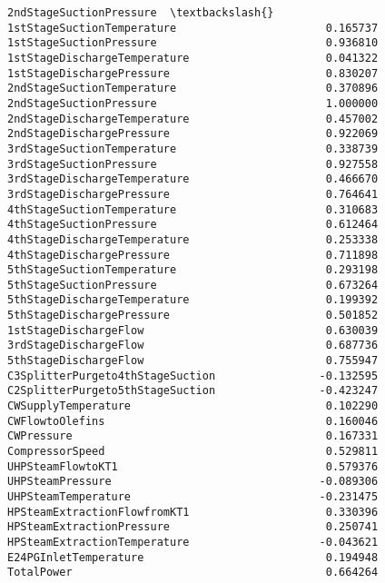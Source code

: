 \documentclass[11pt]{article}
\begin{document}
\begin{tcolorbox}[breakable, size=fbox, boxrule=.5pt, pad at break*=1mm, opacityfill=0]
\begin{Verbatim}[commandchars=\\\{\}]
                                  2ndStageSuctionPressure  \textbackslash{}
1stStageSuctionTemperature                       0.165737
1stStageSuctionPressure                          0.936810
1stStageDischargeTemperature                     0.041322
1stStageDischargePressure                        0.830207
2ndStageSuctionTemperature                       0.370896
2ndStageSuctionPressure                          1.000000
2ndStageDischargeTemperature                     0.457002
2ndStageDischargePressure                        0.922069
3rdStageSuctionTemperature                       0.338739
3rdStageSuctionPressure                          0.927558
3rdStageDischargeTemperature                     0.466670
3rdStageDischargePressure                        0.764641
4thStageSuctionTemperature                       0.310683
4thStageSuctionPressure                          0.612464
4thStageDischargeTemperature                     0.253338
4thStageDischargePressure                        0.711898
5thStageSuctionTemperature                       0.293198
5thStageSuctionPressure                          0.673264
5thStageDischargeTemperature                     0.199392
5thStageDischargePressure                        0.501852
1stStageDischargeFlow                            0.630039
3rdStageDischargeFlow                            0.687736
5thStageDischargeFlow                            0.755947
C3SplitterPurgeto4thStageSuction                -0.132595
C2SplitterPurgeto5thStageSuction                -0.423247
CWSupplyTemperature                              0.102290
CWFlowtoOlefins                                  0.160046
CWPressure                                       0.167331
CompressorSpeed                                  0.529811
UHPSteamFlowtoKT1                                0.579376
UHPSteamPressure                                -0.089306
UHPSteamTemperature                             -0.231475
HPSteamExtractionFlowfromKT1                     0.330396
HPSteamExtractionPressure                        0.250741
HPSteamExtractionTemperature                    -0.043621
E24PGInletTemperature                            0.194948
TotalPower                                       0.664264


\end{Verbatim}
\end{tcolorbox}
\end{document}
